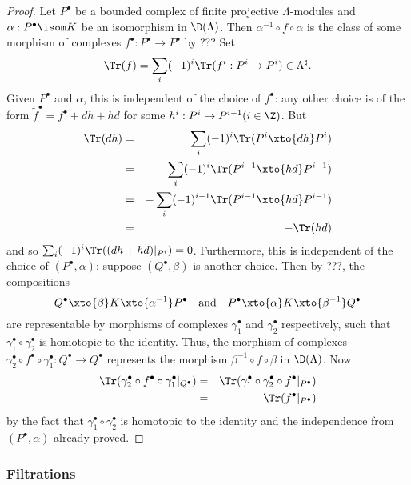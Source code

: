 \begin{proof}
Let $P^\bullet$ be a bounded complex of finite projective $\Lambda$-modules and $\alpha: P^\bullet \isom K$ be an isomorphism in $\D(\Lambda)$. Then $\alpha^{-1}\circ f\circ \alpha$ is the class of some morphism of complexes $f^\bullet: P^\bullet \to P^\bullet$ by ??? Set $$
\Tr(f) = \sum_i (-1)^i \Tr(f^i: P^i \to P^i) \in \Lambda^\natural.
$$
Given $P^\bullet$ and $\alpha$, this is independent of the choice of $f^\bullet$: any other choice is of the form $\tilde{f}^\bullet  = f^\bullet + dh +hd$ for some $h^i: P^i \to P^{i-1}(i\in \Z)$. But
\begin{eqnarray*}
\Tr(dh) & = & \sum_i (-1)^i \Tr(P^i\xto{dh} P^i) \\
& = & \sum_i (-1)^i \Tr(P^{i-1}\xto{hd} P^{i-1}) \\
& = & -\sum_i (-1)^{i-1}\Tr(P^{i-1}\xto{hd} P^{i-1}) \\
& = &- \Tr(hd)
\end{eqnarray*}
and so $\sum_i (-1)^i \Tr ((dh+hd)|_{P^i})=0$. 
Furthermore, this is independent of the choice of $(P^\bullet , \alpha)$: suppose $(Q^\bullet, \beta)$ is another choice. Then by ???, the compositions  
$$ 
Q^\bullet \xto{\beta} K \xto{\alpha^{-1}} P^\bullet
\quad\text{and}\quad
P^\bullet \xto{\alpha} K \xto{\beta^{-1}} Q^\bullet
$$
are representable by morphisms of complexes $\gamma_1^\bullet$ and  $\gamma_2^\bullet$ respectively, such that $\gamma_1^\bullet \circ \gamma_2^\bullet$ is homotopic to the identity. Thus, the morphism of complexes $\gamma_2^\bullet\circ f^\bullet\circ \gamma_1^\bullet: Q^\bullet\to Q^\bullet$ represents the morphism $\beta^{-1}\circ f\circ\beta$ in $\D(\Lambda)$. Now 
\begin{eqnarray*}
\Tr(\gamma_2^\bullet\circ f^\bullet\circ\gamma_1^\bullet|_{Q^\bullet}) & = & \Tr(\gamma_1^\bullet \circ\gamma_2^\bullet \circ f^\bullet|_{P^\bullet})\\ 
& = & \Tr(f^\bullet|_{P^\bullet})
\end{eqnarray*}
by the fact that  $\gamma_1^\bullet \circ \gamma_2^\bullet$ is homotopic to the identity and the independence from $(P^\bullet, \alpha)$ already proved.
\end{proof}

\subsubsection*{Filtrations} 


